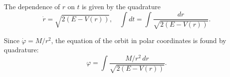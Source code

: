 The dependence of $r$ on $t$ is given by the quadrature
$$\dot{r} = \sqrt{2(E - V(r))}, \quad \int dt = \int \frac{dr}{\sqrt{2(E - V(r))}}.$$

Since $\dot{\varphi} = M/r^2$, the equation of the orbit in polar coordinates is found by quadrature:
$$\varphi = \int \frac{M/r^2 \, dr}{\sqrt{2(E - V(r))}}.$$
